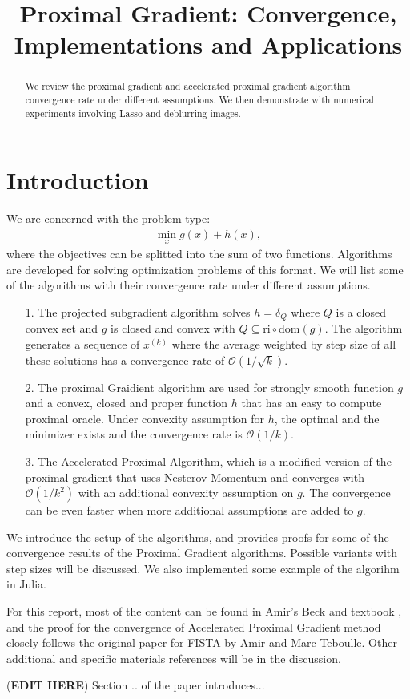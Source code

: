 \documentclass[]{article}
\theoremstyle{definition}
\begin{document}
\title{Proximal Gradient: Convergence, Implementations and Applications}
\maketitle
\begin{abstract}
    We review the proximal gradient and accelerated proximal gradient algorithm convergence rate under different assumptions. We then demonstrate with numerical experiments involving Lasso and deblurring images. 
\end{abstract}

\section{Introduction}
    We are concerned with the problem type: 
    \begin{align}
        \min_{x} g(x) + h(x),
    \end{align}
    where the objectives can be splitted into the sum of two functions. Algorithms are developed for solving optimization problems of this format. We will list some of the algorithms with their convergence rate under different assumptions. 
    \begin{enumerate}
        \item [1.] The projected subgradient algorithm solves $h = \delta_Q$ where $Q$ is a closed convex set and $g$ is closed and convex with $Q\subseteq\text{ri}\circ \text{dom}(g)$. The algorithm generates a sequence of $x^{(k)}$ where the average weighted by step size  of all these solutions has a convergence rate of $\mathcal O(1/\sqrt{k})$. 
        \item [2.] The proximal Graidient algorithm are used for strongly smooth function $g$ and a convex, closed and proper function $h$ that has an easy to compute proximal oracle. Under convexity assumption for $h$, the optimal and the minimizer exists and the convergence rate is $\mathcal O(1/k)$. 
        \item [3.] The Accelerated Proximal Algorithm, which is a modified version of the proximal gradient that uses Nesterov Momentum and converges with $\mathcal O(1/k^2)$ with an additional convexity assumption on $g$. The convergence can be even faster when more additional assumptions are added to $g$. 
    \end{enumerate}
    We introduce the setup of the algorithms, and provides proofs for some of the convergence results of the Proximal Gradient algorithms. Possible variants with step sizes will be discussed. We also implemented some example of the algorihm in Julia. 
    \par
    For this report, most of the content can be found in Amir's Beck and textbook \cite{book:first_order_opt}, and the proof for the convergence of Accelerated Proximal Gradient method closely follows the original paper for FISTA\cite{paper:FISTA} by Amir and Marc Teboulle. Other additional and specific materials references will be in the discussion. 
    \par 
    (\textbf{EDIT HERE}) Section .. of the paper introduces... 
\end{document}
